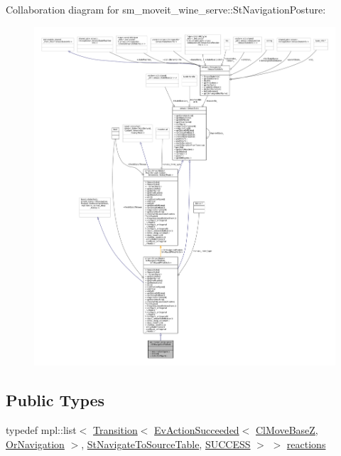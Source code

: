 Collaboration diagram for sm\+\_\+moveit\+\_\+wine\+\_\+serve\+:\+:St\+Navigation\+Posture\+:
\nopagebreak
\begin{figure}[H]
\begin{center}
\leavevmode
\includegraphics[width=350pt]{structsm__moveit__wine__serve_1_1StNavigationPosture__coll__graph}
\end{center}
\end{figure}
\subsection*{Public Types}
\begin{DoxyCompactItemize}
\item 
typedef mpl\+::list$<$ \hyperlink{classsmacc_1_1Transition}{Transition}$<$ \hyperlink{structsmacc_1_1default__events_1_1EvActionSucceeded}{Ev\+Action\+Succeeded}$<$ \hyperlink{classcl__move__base__z_1_1ClMoveBaseZ}{Cl\+Move\+BaseZ}, \hyperlink{classsm__moveit__wine__serve_1_1OrNavigation}{Or\+Navigation} $>$, \hyperlink{structsm__moveit__wine__serve_1_1StNavigateToSourceTable}{St\+Navigate\+To\+Source\+Table}, \hyperlink{structsmacc_1_1default__transition__tags_1_1SUCCESS}{S\+U\+C\+C\+E\+SS} $>$ $>$ \hyperlink{structsm__moveit__wine__serve_1_1StNavigationPosture_a33af22227eae66be5110f376d8f536a5}{reactions}
\end{DoxyCompactItemize}
